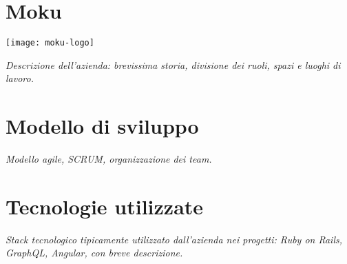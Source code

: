 \section{Moku}

\begin{center}
	\texttt{[image: moku-logo]}
\end{center}

\emph{Descrizione dell'azienda: brevissima storia, divisione dei ruoli, spazi e luoghi di lavoro.}

\section{Modello di sviluppo}
\emph{Modello agile, SCRUM, organizzazione dei team.}

\section{Tecnologie utilizzate}
\emph{Stack tecnologico tipicamente utilizzato dall'azienda nei progetti: Ruby on Rails, GraphQL, Angular, con breve descrizione.}
